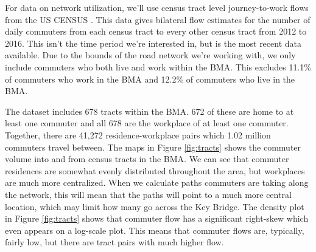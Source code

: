 \documentclass[11pt]{article}
\numberwithin{equation}{section} %
\numberwithin{figure}{section} %
\numberwithin{table}{section} %
\theoremstyle{definition}
\begin{document}
For data on network utilization, we'll use census tract level journey-to-work flows from the US CENSUS \parencite{Bolton20}. This data gives bilateral flow estimates for the number of daily commuters from each census tract to every other census tract from 2012 to 2016. This isn't the time period we're interested in, but is the most recent data available. Due to the bounds of the road network we're working with, we only include commuters who both live and work within the BMA. This excludes 11.1\% of commuters who work in the BMA and 12.2\% of commuters who live in the BMA.

The dataset includes 678 tracts within the BMA. 672 of these are home to at least one commuter and all 678 are the workplace of at least one commuter. Together, there are 41,272 residence-workplace pairs which 1.02 million commuters travel between. The maps in Figure \ref{fig:tracts} shows the commuter volume into and from census tracts in the BMA. We can see that commuter residences are somewhat evenly distributed throughout the area, but workplaces are much more centralized. When we calculate paths commuters are taking along the network, this will mean that the paths will point to a much more central location, which may limit how many go across the Key Bridge. The density plot in Figure \ref{fig:tracts} shows that commuter flow has a significant right-skew which even appears on a log-scale plot. This means that commuter flows are, typically, fairly low, but there are tract pairs with much higher flow.
\end{document}
